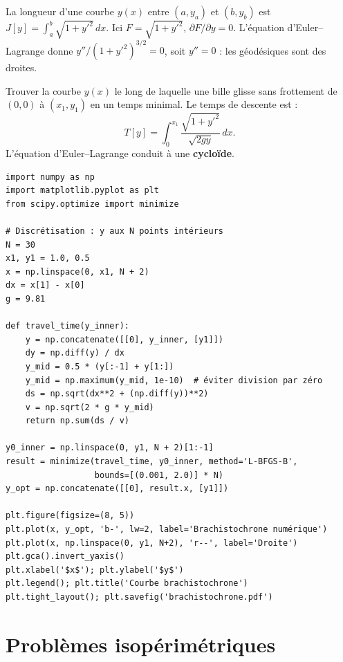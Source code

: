 \begin{exemple}
La longueur d'une courbe $y(x)$ entre $(a,y_a)$ et $(b,y_b)$ est
$J[y]=\int_a^b\sqrt{1+y'^2}\,dx$.  Ici $F=\sqrt{1+y'^2}$,
$\partial F/\partial y=0$.  L'\'equation d'Euler--Lagrange donne
$y''/({1+y'^2})^{3/2}=0$, soit $y''=0$ : les g\'eod\'esiques sont
des droites.
\end{exemple}

\begin{exemple}[Brachistochrone]
Trouver la courbe $y(x)$ le long de laquelle une bille glisse sans
frottement de $(0,0)$ \`a $(x_1,y_1)$ en un temps minimal.  Le temps
de descente est :
\[
  T[y] = \int_0^{x_1}\frac{\sqrt{1+y'^2}}{\sqrt{2gy}}\,dx.
\]
L'\'equation d'Euler--Lagrange conduit \`a une \textbf{cyclo\"ide}.
\end{exemple}

\begin{codeblock}[title=\textbf{Brachistochrone num\'erique}]
\begin{verbatim}
import numpy as np
import matplotlib.pyplot as plt
from scipy.optimize import minimize

# Discrétisation : y aux N points intérieurs
N = 30
x1, y1 = 1.0, 0.5
x = np.linspace(0, x1, N + 2)
dx = x[1] - x[0]
g = 9.81

def travel_time(y_inner):
    y = np.concatenate([[0], y_inner, [y1]])
    dy = np.diff(y) / dx
    y_mid = 0.5 * (y[:-1] + y[1:])
    y_mid = np.maximum(y_mid, 1e-10)  # éviter division par zéro
    ds = np.sqrt(dx**2 + (np.diff(y))**2)
    v = np.sqrt(2 * g * y_mid)
    return np.sum(ds / v)

y0_inner = np.linspace(0, y1, N + 2)[1:-1]
result = minimize(travel_time, y0_inner, method='L-BFGS-B',
                  bounds=[(0.001, 2.0)] * N)
y_opt = np.concatenate([[0], result.x, [y1]])

plt.figure(figsize=(8, 5))
plt.plot(x, y_opt, 'b-', lw=2, label='Brachistochrone numérique')
plt.plot(x, np.linspace(0, y1, N+2), 'r--', label='Droite')
plt.gca().invert_yaxis()
plt.xlabel('$x$'); plt.ylabel('$y$')
plt.legend(); plt.title('Courbe brachistochrone')
plt.tight_layout(); plt.savefig('brachistochrone.pdf')
\end{verbatim}
\end{codeblock}

\section{Probl\`emes isop\'erim\'etriques}

